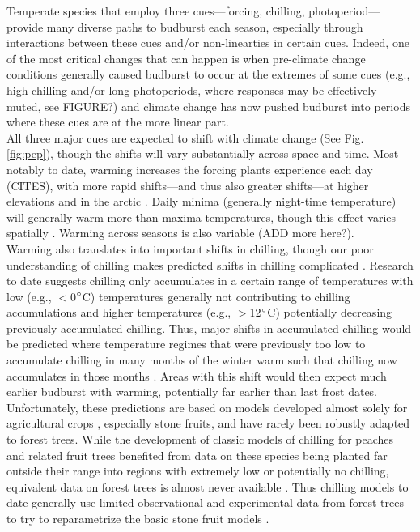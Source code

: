 \documentclass[11pt,letter]{article}
\begin{document}
Temperate species that employ three cues---forcing, chilling, photoperiod---provide many diverse paths to budburst each season, especially through interactions between these cues and/or non-linearties in certain cues. Indeed, one of the most critical changes that can happen is when pre-climate change conditions generally caused budburst to occur at the extremes of some cues (e.g., high chilling and/or long photoperiods, where responses may be effectively muted, see FIGURE?) and climate change has now pushed budburst into periods where these cues are at the more linear part.\\ 

All three major cues are expected to shift with climate change (See Fig. \ref{fig:pep}), though the shifts will vary substantially across space and time. Most notably to date, warming increases the forcing plants experience each day (CITES), with more rapid shifts---and thus also greater shifts---at higher elevations and in the arctic \citep{IPCC:2014sm}. Daily minima (generally night-time temperature) will generally warm more than maxima temperatures, though this effect varies spatially \citep{Alexander:2006qy}. Warming across seasons is also variable (ADD more here?). \\ %

Warming also translates into important shifts in chilling, though our poor understanding of chilling makes predicted shifts in chilling complicated \citep{chuine2016}. Research to date suggests chilling only accumulates in a certain range of temperatures with low (e.g., $<$0$\degree$C) temperatures generally not contributing to chilling accumulations and higher temperatures (e.g., $>$12$\degree$C) potentially decreasing previously accumulated chilling. Thus, major shifts in accumulated chilling would be predicted where temperature regimes that were previously too low to accumulate chilling in many months of the winter warm such that chilling now accumulates in those months \citep{guy2014}. Areas with this shift would then expect much earlier budburst with warming, potentially far earlier than last frost dates. Unfortunately, these predictions are based on models developed almost solely for agricultural crops \citep[but see][]{harrington2015}, especially stone fruits, and have rarely been robustly adapted to forest trees. While the development of classic models of chilling for peaches and related fruit trees benefited from data on these species being planted far outside their range into regions with extremely low or potentially no chilling, equivalent data on forest trees is almost never available \citep{dennis2003}. Thus chilling models to date generally use limited observational and experimental data from forest trees to try to reparametrize the basic stone fruit models \citep{Chuine2000}.\\
\end{document}
